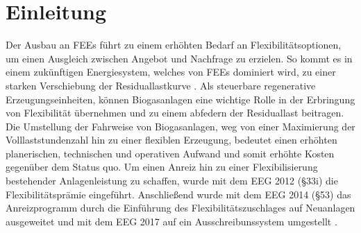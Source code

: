 \section{Einleitung}

Der Ausbau an \glspl{FEE} führt zu einem erhöhten Bedarf an Flexibilitätsoptionen, um einen Ausgleich zwischen Angebot und Nachfrage zu erzielen. So kommt es in einem zukünftigen Energiesystem, welches von \glspl{FEE} dominiert wird, zu einer starken Verschiebung der Residuallastkurve \parencite{ISE2013}. Als steuerbare regenerative Erzeugungseinheiten, können Biogasanlagen eine wichtige Rolle in der Erbringung von Flexibilität übernehmen und zu einem abfedern der Residuallast beitragen.\medskip\\
Die Umstellung der Fahrweise von Biogasanlagen, weg von einer Maximierung der Volllaststundenzahl hin zu einer flexiblen Erzeugung, bedeutet einen erhöhten planerischen, technischen und operativen Aufwand und somit erhöhte Kosten gegenüber dem Status quo. Um einen Anreiz hin zu einer Flexibilisierung bestehender Anlagenleistung zu schaffen, wurde mit dem EEG 2012 (\S 33i) die Flexibilitätsprämie eingeführt. Anschließend wurde mit dem EEG 2014 (\S 53) das Anreizprogramm durch die Einführung des Flexibilitätszuschlages auf Neuanlagen ausgeweitet und mit dem EEG 2017 auf ein Ausschreibunssystem umgestellt \parencite{DanielGromke2019}.

